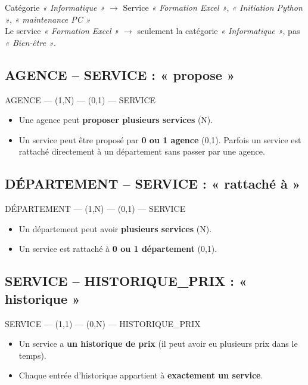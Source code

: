 \documentclass[12pt,a4paper]{article}
\begin{document}
\begin{exemplebox}
    \small
    Catégorie \textit{« Informatique »} \(\rightarrow\) Service \textit{« Formation Excel »}, \textit{« Initiation Python »}, \textit{« maintenance PC »}\\
    Le service \textit{« Formation Excel »} \(\rightarrow\) seulement la catégorie \textit{« Informatique »}, pas \textit{« Bien-être »}.
\end{exemplebox}

\subsection{AGENCE -- SERVICE : « propose »}


AGENCE --- (1,N) --- (0,1) --- SERVICE


\begin{itemize}
    \item Une agence peut \textbf{proposer plusieurs services} (N).
    \item Un service peut être proposé par \textbf{0 ou 1 agence} (0,1). Parfois un service est rattaché directement à un département sans passer par une agence.
\end{itemize}

\subsection{DÉPARTEMENT -- SERVICE : « rattaché à »}


DÉPARTEMENT --- (1,N) --- (0,1) --- SERVICE


\begin{itemize}
    \item Un département peut avoir \textbf{plusieurs services} (N).
    \item Un service est rattaché à \textbf{0 ou 1 département} (0,1).
\end{itemize}

\subsection{SERVICE -- HISTORIQUE\_PRIX : « historique »}


SERVICE --- (1,1) --- (0,N) --- HISTORIQUE\_PRIX


\begin{itemize}
    \item Un service a \textbf{un historique de prix} (il peut avoir eu plusieurs prix dans le temps).
    \item Chaque entrée d'historique appartient à \textbf{exactement un service}.
\end{itemize}
\end{document}
